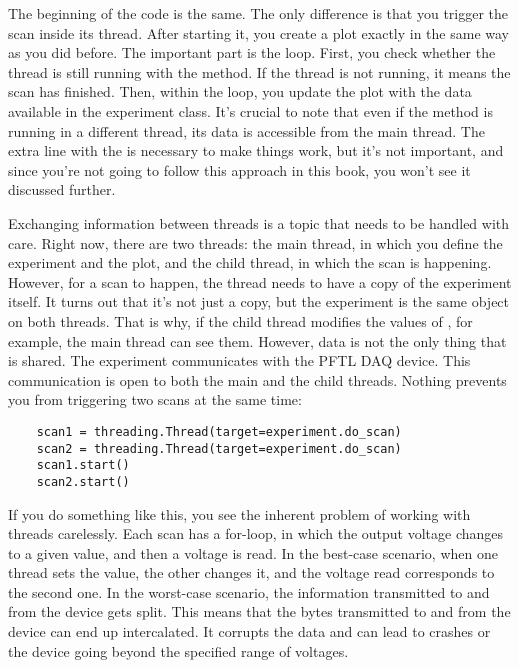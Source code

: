 The beginning of the code is the same. The only difference is that you trigger the scan inside its thread. After starting it, you create a plot exactly in the same way as you did before. The important part is the  loop. First, you check whether the thread is still running with the  method. If the thread is not running, it means the scan has finished. Then, within the loop, you update the plot with the data available in the experiment class. It's crucial to note that even if the  method is running in a different thread, its data is accessible from the main thread. The extra line with the  is necessary to make things work, but it's not important, and since you're not going to follow this approach in this book, you won't see it discussed further.

Exchanging information between threads is a topic that needs to be handled with care. Right now, there are two threads: the main thread, in which you define the experiment and the plot, and the child thread, in which the scan is happening. However, for a scan to happen, the thread needs to have a copy of the experiment itself. It turns out that it's not just a copy, but the experiment is the same object on both threads. That is why, if the child thread modifies the values of , for example, the main thread can see them. However, data is not the only thing that is shared. The experiment communicates with the {PFTL DAQ} device. This communication is open to both the main and the child threads. Nothing prevents you from triggering two scans at the same time:

\begin{verbatim}
    scan1 = threading.Thread(target=experiment.do_scan)
    scan2 = threading.Thread(target=experiment.do_scan)
    scan1.start()
    scan2.start()
\end{verbatim}

If you do something like this, you see the inherent problem of working with threads carelessly. Each scan has a for-loop, in which the output voltage changes to a given value, and then a voltage is read. In the best-case scenario, when one thread sets the value, the other changes it, and the voltage read corresponds to the second one. In the worst-case scenario, the information transmitted to and from the device gets split. This means that the bytes transmitted to and from the device can end up intercalated. It corrupts the data and can lead to crashes or the device going beyond the specified range of voltages.

